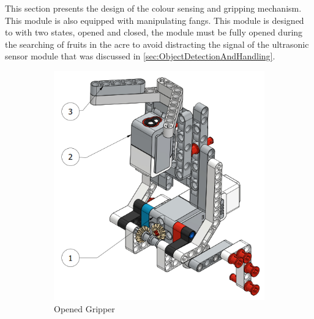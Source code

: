 \noindent This section presents the design of the colour sensing and gripping mechanism. This module is also equipped with manipulating fangs. This module is designed to with two states, opened and closed, the module must be fully opened during the searching of fruits in the acre to avoid distracting the signal of the ultrasonic sensor module that was discussed in \vref{sec:ObjectDetectionAndHandling}.
\begin{figure}[!ht]
	\centering
	\begin{subfigure}[b]{0.45\textwidth}
		\centering
		\includegraphics[width=\textwidth]{Graphics/OpenedGripper}
		\caption{Opened Gripper}
		\label{fig:OpenedGripper}
	\end{subfigure}
	~
	\begin{subfigure}[b]{0.45\textwidth}
		\centering

\end{subfigure}
\end{figure}
